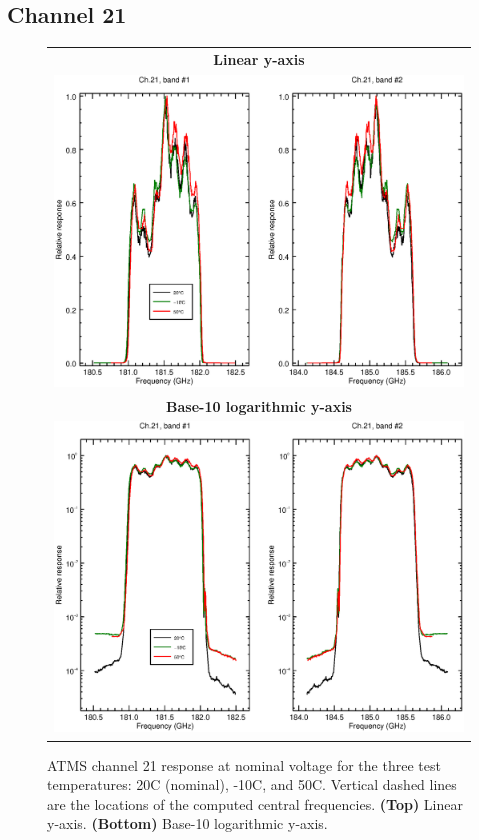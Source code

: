 \subsection{Channel 21}
\begin{figure}[H]
  \label{fig:Tset.ch21_response}
  \centering
  \begin{tabular}{c}
    \hspace{0.75cm}\sffamily\textbf{Linear y-axis} \\
    \includegraphics[scale=0.55]{graphics/srf/Tset/lin/atms_npp-21.eps} \\
    \hspace{0.75cm}\sffamily\textbf{Base-10 logarithmic y-axis} \\
    \includegraphics[scale=0.55]{graphics/srf/Tset/log/atms_npp-21.eps}
  \end{tabular}
  \caption{ATMS channel 21 response at nominal voltage for the three test temperatures: 20\textdegree{}C (nominal), -10\textdegree{}C, and 50\textdegree{}C. Vertical dashed lines are the locations of the computed central frequencies. \textbf{(Top)} Linear y-axis. \textbf{(Bottom)} Base-10 logarithmic y-axis.}
\end{figure}


